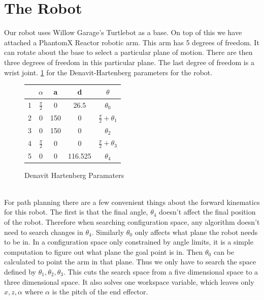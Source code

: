 \documentclass{article}
\begin{document}
\section{The Robot}
Our robot uses Willow Garage's Turtlebot as a base. On top of this we have attached a PhantomX Reactor robotic arm. This arm has 5 degrees of freedom. It can rotate about the base to select a particular plane of motion.  There are then three degrees of freedom in this particular plane.  The last degree of freedom is a wrist joint. \ref{fig:DHparam} for the Denavit-Hartenberg parameters for the robot. \\
\begin{figure}[hb]
\centering
\begin{tabular}{|r|c|c|c|c|}
\hline
&$\alpha$ & a & d & $\theta$\\
\hline
\hline
1& $\frac{\pi}{2}$ & 0 & 26.5 & $\theta_0$\\
\hline
2& 0 & 150 & 0 & $\frac{\pi}{2}+\theta_1$\\
\hline
3& 0 & 150 & 0 & $\theta_2$\\
\hline
4& $\frac{\pi}{2}$& 0 & 0 & $\frac{\pi}{2}+\theta_3$\\
\hline
5& 0& 0& 116.525 & $\theta_4$\\
\hline
\end{tabular}
\caption{Denavit Hartenberg Paramaters}
\label{fig:DHparam}
\end{figure} \\
For path planning there are a few convenient things about the forward kinematics for this robot. The first is that the final angle, $\theta_4$ doesn't affect the final position of the robot. Therefore when searching configuration space, any algorithm doesn't need to search changes in $\theta_4$. Similarly $\theta_0$ only affects what plane the robot needs to be in. In a configuration space only constrained by angle limits, it is a simple computation to figure out what plane the goal point is in. Then $\theta_0$ can be calculated to point the arm in that plane. Thus we only have to search the space defined by $\theta_1,\theta_2,\theta_3$. This cuts the search space from a five dimensional space to a three dimensional space. It also solves one workspace variable, which leaves only $x,z,\alpha$ where $\alpha$ is the pitch of the end effector. 
\end{document}
